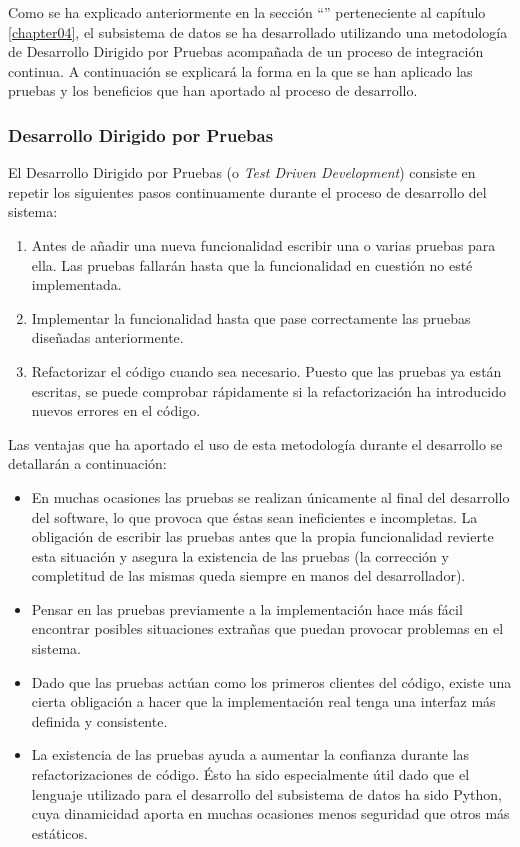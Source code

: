Como se ha explicado anteriormente en la sección ``'' perteneciente al capítulo \ref{chapter04}, el subsistema de datos se ha desarrollado utilizando una metodología de Desarrollo Dirigido por Pruebas acompañada de un proceso de integración continua.  A continuación se explicará la forma en la que se han aplicado las pruebas y los beneficios que han aportado al proceso de desarrollo.

\subsubsection{Desarrollo Dirigido por Pruebas}
	El Desarrollo Dirigido por Pruebas (o \textit{Test Driven Development}) consiste en repetir los siguientes pasos continuamente durante el proceso de desarrollo del sistema:
	\begin{enumerate}
		\item
			Antes de añadir una nueva funcionalidad escribir una o varias pruebas para ella.  Las pruebas fallarán hasta que la funcionalidad en cuestión no esté implementada.
		\item
			Implementar la funcionalidad hasta que pase correctamente las pruebas diseñadas anteriormente.
		\item
			Refactorizar el código cuando sea necesario.  Puesto que las pruebas ya están escritas, se puede comprobar rápidamente si la refactorización ha introducido nuevos errores en el código.
	\end{enumerate}
	
	Las ventajas que ha aportado el uso de esta metodología durante el desarrollo se detallarán a continuación:
	\begin{itemize}
		\item
			En muchas ocasiones las pruebas se realizan únicamente al final del desarrollo del software, lo que provoca que éstas sean ineficientes e incompletas.  La obligación de escribir las pruebas antes que la propia funcionalidad revierte esta situación y asegura la existencia de las pruebas (la corrección y completitud de las mismas queda siempre en manos del desarrollador).
		\item
			Pensar en las pruebas previamente a la implementación hace más fácil encontrar posibles situaciones extrañas que puedan provocar problemas en el sistema.
		\item
			Dado que las pruebas actúan como los primeros clientes del código, existe una cierta obligación a hacer que la implementación real tenga una interfaz más definida y consistente.
		\item
			La existencia de las pruebas ayuda a aumentar la confianza durante las refactorizaciones de código.  Ésto ha sido especialmente útil dado que el lenguaje utilizado para el desarrollo del subsistema de datos ha sido Python, cuya dinamicidad aporta en muchas ocasiones menos seguridad que otros más estáticos.
	\end{itemize}
	
